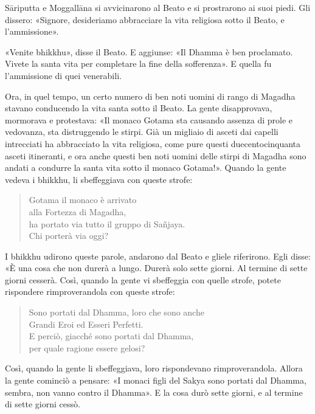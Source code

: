 Sāriputta e Moggallāna si avvicinarono al Beato e si prostrarono ai suoi piedi.
Gli dissero: «Signore, desideriamo abbracciare la vita religiosa sotto il Beato,
e l’ammissione».

«Venite bhikkhu», disse il Beato. E aggiunse: «Il Dhamma è ben proclamato.
Vivete la santa vita per completare la fine della sofferenza». E quella fu
l’ammissione di quei venerabili.

Ora, in quel tempo, un certo numero di ben noti uomini di rango di Magadha
stavano conducendo la vita santa sotto il Beato. La gente disapprovava,
mormorava e protestava: «Il monaco Gotama sta causando assenza di prole e
vedovanza, sta distruggendo le stirpi. Già un migliaio di asceti dai capelli
intrecciati ha abbracciato la vita religiosa, come pure questi duecentocinquanta
asceti itineranti, e ora anche questi ben noti uomini delle stirpi di Magadha
sono andati a condurre la santa vita sotto il monaco Gotama!». Quando la gente
vedeva i bhikkhu, li sbeffeggiava con queste strofe:

\begin{quote}
Gotama il monaco è arrivato \\
alla Fortezza di Magadha, \\
ha portato via tutto il gruppo di Sañjaya. \\
Chi porterà via oggi?
\end{quote}

I bhikkhu udirono queste parole, andarono dal Beato e gliele riferirono. Egli
disse: «È una cosa che non durerà a lungo. Durerà solo sette giorni. Al termine
di sette giorni cesserà. Così, quando la gente vi sbeffeggia con quelle strofe,
potete rispondere rimproverandola con queste strofe:

\begin{quote}
Sono portati dal Dhamma, loro che sono anche \\
Grandi Eroi ed Esseri Perfetti. \\
E perciò, giacché sono portati dal Dhamma, \\
per quale ragione essere gelosi?
\end{quote}

Così, quando la gente li sbeffeggiava, loro rispondevano rimproverandola. Allora
la gente cominciò a pensare: «I monaci figli del Sakya sono portati dal Dhamma,
sembra, non vanno contro il Dhamma». E la cosa durò sette giorni, e al termine
di sette giorni cessò.


